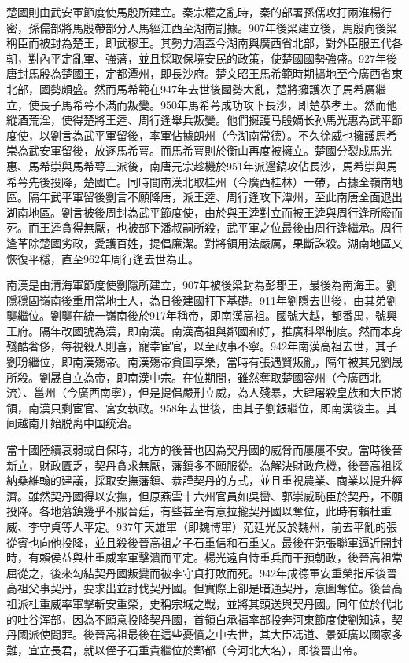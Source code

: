 楚國則由武安軍節度使馬殷所建立。秦宗權之亂時，秦的部署孫儒攻打兩淮楊行密，孫儒部將馬殷帶部分人馬經江西至湖南割據。907年後梁建立後，馬殷向後梁稱臣而被封為楚王，即武穆王。其勢力涵蓋今湖南與廣西省北部，對外臣服五代各朝，對內平定亂軍、強藩，並且採取保境安民的政策，使楚國國勢強盛。927年後唐封馬殷為楚國王，定都潭州，即長沙府。楚文昭王馬希範時期擴地至今廣西省東北部，國勢頗盛。然而馬希範在947年去世後國勢大亂，楚將擁護次子馬希廣繼立，使長子馬希萼不滿而叛變。950年馬希萼成功攻下長沙，即楚恭孝王。然而他縱酒荒淫，使得楚將王逵、周行逢舉兵叛變。他們擁護马殷嫡长孙馬光惠為武平節度使，以劉言為武平軍留後，率軍佔據朗州（今湖南常德）。不久徐威也擁護馬希崇為武安軍留後，放逐馬希萼。而馬希萼則於衡山再度被擁立。楚國分裂成馬光惠、馬希崇與馬希萼三派後，南唐元宗趁機於951年派邊鎬攻佔長沙，馬希崇與馬希萼先後投降，楚國亡。同時間南漢北取桂州（今廣西桂林）一帶，占據全嶺南地區。隔年武平軍留後劉言不願降唐，派王逵、周行逢攻下潭州，至此南唐全面退出湖南地區。劉言被後周封為武平節度使，由於與王逵對立而被王逵與周行逢所廢而死。而王逵貪得無厭，也被部下潘叔嗣所殺，武平軍之位最後由周行逢繼承。周行逢革除楚國劣政，愛護百姓，提倡廉潔。對將領用法嚴厲，果斷誅殺。湖南地區又恢復平穩，直至962年周行逢去世為止。

南漢是由清海軍節度使劉隱所建立，907年被後梁封為彭郡王，最後為南海王。劉隱穩固嶺南後重用當地士人，為日後建國打下基礎。911年劉隱去世後，由其弟劉龑繼位。劉龑在統一嶺南後於917年稱帝，即南漢高祖。國號大越，都番禺，號興王府。隔年改國號為漢，即南漢。南漢高祖與鄰國和好，推廣科舉制度。然而本身殘酷奢侈，每視殺人則喜，寵幸宦官，以至政事不寧。942年南漢高祖去世，其子劉玢繼位，即南漢殤帝。南漢殤帝貪圖享樂，當時有張遇賢叛亂，隔年被其兄劉晟所殺。劉晟自立為帝，即南漢中宗。在位期間，雖然奪取楚國容州（今廣西北流）、邕州（今廣西南寧），但是提倡嚴刑立威，為人殘暴，大肆屠殺皇族和大臣將領，南漢只剩宦官、宮女執政。958年去世後，由其子劉鋹繼位，即南漢後主。其间越南开始脱离中国统治。

當十國陸續衰弱或自保時，北方的後晉也因為契丹國的威脅而屢屢不安。當時後晉新立，財政匱乏，契丹貪求無厭，藩鎮多不願服從。為解決財政危機，後晉高祖採納桑維翰的建議，採取安撫藩鎮、恭謹契丹的方式，並且重視農業、商業以提升經濟。雖然契丹國得以安撫，但原燕雲十六州官員如吳巒、郭崇威恥臣於契丹，不願投降。各地藩鎮幾乎不服晉廷，有些甚至有意拉攏契丹國以奪位，此時有賴杜重威、李守貞等人平定。937年天雄軍（即魏博軍）范廷光反於魏州，前去平亂的張從賓也向他投降，並且殺後晉高祖之子石重信和石重乂。最後在范張聯軍逼近開封時，有賴侯益與杜重威率軍擊潰而平定。楊光遠自恃重兵而干預朝政，後晉高祖常屈從之，後來勾結契丹國叛變而被李守貞打敗而死。942年成德軍安重榮指斥後晉高祖父事契丹，要求出並討伐契丹國。但實際上卻是暗通契丹，意圖奪位。後晉高祖派杜重威率軍擊斬安重榮，史稱宗城之戰，並將其頭送與契丹國。同年位於代北的吐谷浑部，因為不願意投降契丹國，首領白承福率部投奔河東節度使劉知遠，契丹國派使問罪。後晉高祖最後在這些憂憤之中去世，其大臣馮道、景延廣以國家多難，宜立長君，就以侄子石重貴繼位於鄴都（今河北大名），即後晉出帝。

